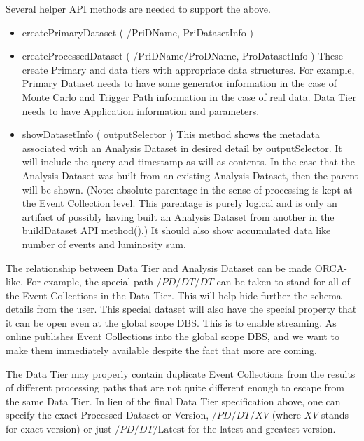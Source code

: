 \documentclass{cmspaper}
\begin{document}
Several helper API methods are needed to support the above.  

\begin{itemize}
\item  createPrimaryDataset ( /PriDName, PriDatasetInfo )
\item  createProcessedDataset ( /PriDName/ProDName, ProDatasetInfo )
      These create Primary and data tiers with appropriate data
      structures.  For example, Primary Dataset needs to have some
      generator information in the case of Monte Carlo and Trigger Path
      information in the case of real data.  Data Tier needs to have
      Application information and parameters.

\item  showDatasetInfo ( outputSelector )
      This method shows the metadata associated with an Analysis Dataset
      in desired detail by outputSelector.  It will include the query
      and timestamp as will as contents.  In the case that the Analysis
      Dataset was built from an existing Analysis Dataset, then the parent
      will be shown.  (Note: absolute parentage in the sense of processing
      is kept at the Event Collection level.  This parentage is purely
      logical and is only an artifact of possibly having built an Analysis
      Dataset from another in the buildDataset API method().)  It should
      also show accumulated data like number of events and luminosity sum.

\end{itemize}

The relationship between Data Tier and Analysis Dataset can be made
ORCA-like.  For example, the special path $/PD/DT/DT$ can be taken to
stand for all of the Event Collections in the Data Tier.  This will help
hide further the schema details from the user.   This special dataset
will also have the special property that it can be open even at the
global scope DBS.  This is to enable streaming.  As online publishes
Event Collections into the global scope DBS, and we want to make them
immediately available despite the fact that more are coming.

The Data Tier may properly contain duplicate Event Collections from
the results of different processing paths that are not quite different
enough to escape from the same Data Tier. In lieu of the final Data
Tier specification above, one can specify the exact Processed Dataset
or Version, $/PD/DT/XV$ (where $XV$ stands for exact version) or just
$/PD/DT/\mbox{Latest}$ for the latest and greatest version.
\end{document}
